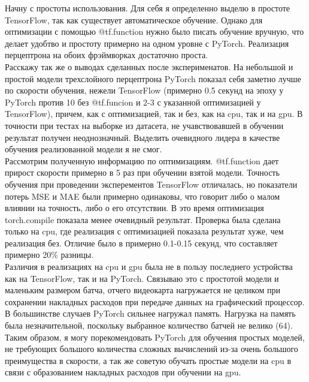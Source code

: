 \documentclass[a4paper,12pt,titlepage,final]{article}
\begin{document}
Начну с простоты использования. Для себя я определенно выделю в простоте TensorFlow, так как существует автоматическое обучение. Однако для оптимизации с помощью @tf.function нужно было писать обучение вручную, что делает удобтво и простоту примерно на одном уровне с PyTorch. Реализация перцептрона на обоих фрэймворках достаточно проста.\\

Расскажу так же о выводах сделанных после эксперименатов. На небольшой и простой модели трехслойного перцептрона PyTorch показал себя заметно лучше по скорости обучения, нежели TensorFlow (примерно 0.5 секунд на эпоху у PyTorch против 10 без @tf.funcion и 2-3 с указанной оптимизацией у TensorFlow), причем, как с оптимизацией, так и без, как на cpu, так и на gpu. В точности при тестах на выборке из датасета, не учавствовавшей в обучении результат получен неоднозначный. Выделить очевидного лидера в качестве обучения реализованной модели я не смог.\\

Рассмотрим полученную информацию по оптимизациям. @tf.function дает прирост скорости примерно в 5 раз при обучении взятой модели. Точность обучения при проведении эксперементов TensorFlow отличалась, но показатели потерь MSE и MAE были примерно одинаковы, что говорит либо о малом влиянии на точность, либо о его отсутствии. В это время оптимизация torch.compile показала менее очевидный результат. Проверка была сделана только на cpu, где реализация с оптимизацией показала результат хуже, чем реализация без. Отличие было в примерно 0.1-0.15 секунд, что составляет примерно 20\% разницы.\\

Различия в реализациях на cpu и gpu была не в пользу последнего устройства как на TensorFlow, так и на PyTorch. Связываю это с простотой модели и маленьким размером батча, отчего видеокарта нагружается не целиком при сохранении накладных расходов при передаче данных на графический процессор.\\

В большинстве случаев PyTorch сильнее нагружал память. Нагрузка на память была незначительной, поскольку выбранное количество батчей не велико (64).\\

Таким образом, я могу порекомендовать PyTorch для обучения простых моделей, не требующих большого количества сложных вычислений из-за очень большого преимущества в скорости, а так же советую обучать простые модели на cpu в связи с образованием накладных расходов при обучении на gpu.\\
\end{document}
